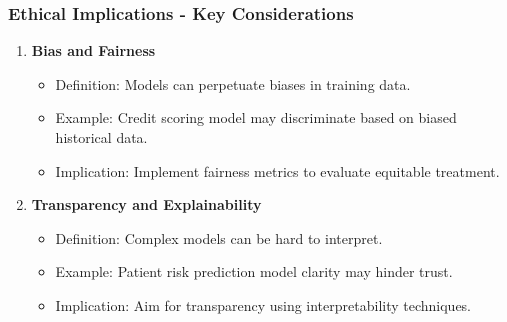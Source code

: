 \documentclass[aspectratio=169]{beamer}
\begin{document}
\begin{frame}[fragile]
    \frametitle{Ethical Implications - Key Considerations}
    \begin{enumerate}
        \item \textbf{Bias and Fairness}
            \begin{itemize}
                \item Definition: Models can perpetuate biases in training data.
                \item Example: Credit scoring model may discriminate based on biased historical data.
                \item Implication: Implement fairness metrics to evaluate equitable treatment.
            \end{itemize}
        
        \item \textbf{Transparency and Explainability}
            \begin{itemize}
                \item Definition: Complex models can be hard to interpret.
                \item Example: Patient risk prediction model clarity may hinder trust.
                \item Implication: Aim for transparency using interpretability techniques.
            \end{itemize}
    \end{enumerate}
\end{frame}
\end{document}
